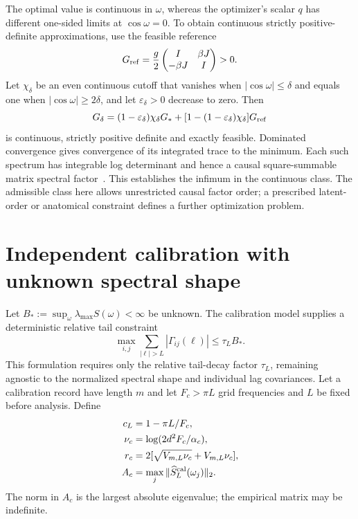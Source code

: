 The optimal value is continuous in $\omega$, whereas the optimizer's scalar $q$ has different one-sided limits at $\cos\omega=0$. To obtain continuous strictly positive-definite approximations, use the feasible reference
\begin{equation}
 G_{\rm ref}=\frac{g}{2}\begin{pmatrix}I&\beta J\\-\beta J&I\end{pmatrix}>0.
\end{equation}
Let $\chi_\delta$ be an even continuous cutoff that vanishes when $|\cos\omega|\le\delta$ and equals one when $|\cos\omega|\ge2\delta$, and let $\varepsilon_\delta>0$ decrease to zero. Then
\begin{equation}
 G_\delta=(1-\varepsilon_\delta)\chi_\delta G_*
 +[1-(1-\varepsilon_\delta)\chi_\delta]G_{\rm ref}
\end{equation}
is continuous, strictly positive definite and exactly feasible. Dominated convergence gives convergence of its integrated trace to the minimum. Each such spectrum has integrable log determinant and hence a causal square-summable matrix spectral factor~\cite{ephremidze2007}. This establishes the infimum in the continuous class. The admissible class here allows unrestricted causal factor order; a prescribed latent-order or anatomical constraint defines a further optimization problem.

\section{Independent calibration with unknown spectral shape}\label{app:unknowncalR4}
Let $B_*:=\sup_\omega\lambda_{\max}S(\omega)<\infty$ be unknown. The calibration model supplies a deterministic relative tail constraint
\begin{equation}\label{eq:relativetailR4}
 \max_{i,j}\sum_{|\ell|>L}|\Gamma_{ij}(\ell)|\le\tau_L B_*.
\end{equation}
This formulation requires only the relative tail-decay factor $\tau_L$, remaining agnostic to the normalized spectral shape and individual lag covariances. Let a calibration record have length $m$ and let $F_c>\pi L$ grid frequencies and $L$ be fixed before analysis. Define
\begin{align}
 c_L&=1-\pi L/F_c,\\
 \nu_c&=\log(2d^2F_c/\alpha_c),\\
 r_c&=2[\sqrt{V_{m,L}\nu_c}+V_{m,L}\nu_c],\\
 A_c&=\max_j\|\widehat S^{\rm cal}_L(\omega_j)\|_2.
\end{align}
The norm in $A_c$ is the largest absolute eigenvalue; the empirical matrix may be indefinite.

